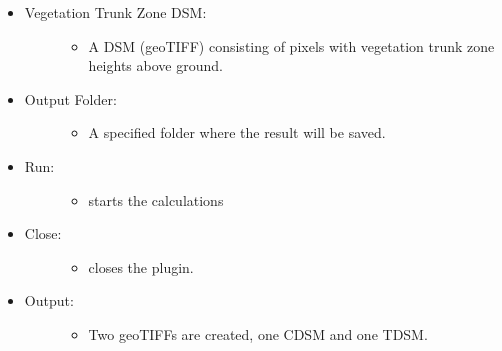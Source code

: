 \documentclass[letterpaper,10pt,english]{sphinxmanual}
\begin{document}
\begin{itemize}
\begin{description}
\begin{itemize}
\end{itemize}

\end{description}

\item {} \begin{description}
\item[{Vegetation Trunk Zone DSM:}] \leavevmode\begin{itemize}
\item {} 
A DSM (geoTIFF) consisting of pixels with vegetation trunk zone heights above ground.

\end{itemize}

\end{description}

\item {} \begin{description}
\item[{Output Folder:}] \leavevmode\begin{itemize}
\item {} 
A specified folder where the result will be saved.

\end{itemize}

\end{description}

\item {} \begin{description}
\item[{Run:}] \leavevmode\begin{itemize}
\item {} 
starts the calculations

\end{itemize}

\end{description}

\item {} \begin{description}
\item[{Close:}] \leavevmode\begin{itemize}
\item {} 
closes the plugin.

\end{itemize}

\end{description}

\item {} \begin{description}
\item[{Output:}] \leavevmode\begin{itemize}
\item {} 
Two geoTIFFs are created, one CDSM and one TDSM.


\end{itemize}
\end{description}
\end{itemize}
\end{document}
